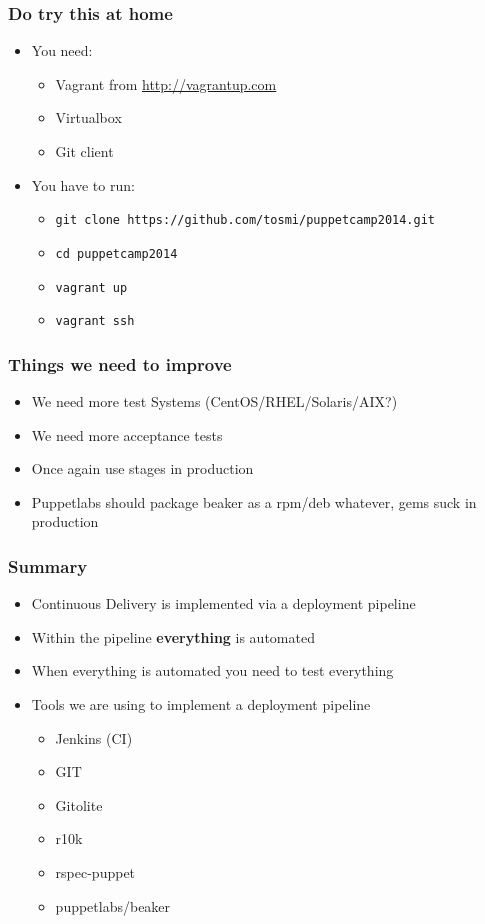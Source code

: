 \documentclass{beamer}
\begin{document}
\begin{frame}
\end{frame}

\begin{frame}
  \frametitle{Do try this at home}

  \begin{itemize}
  \item You need:
    \begin{itemize}
    \item Vagrant from \url{http://vagrantup.com}
    \item Virtualbox
    \item Git client
    \end{itemize}
  \item You have to run:
    \begin{itemize}
    \item \texttt{git clone https://github.com/tosmi/puppetcamp2014.git}
    \item \texttt{cd puppetcamp2014}
    \item \texttt{vagrant up}
    \item \texttt{vagrant ssh}
    \end{itemize}
  \end{itemize}
\end{frame}

\begin{frame}
  \frametitle{Things we need to improve}

  \begin{itemize}
  \item We need more test Systems (CentOS/RHEL/Solaris/AIX?)
  \item We need more acceptance tests
  \item Once again use stages in production
  \item Puppetlabs should package beaker as a rpm/deb whatever, gems
    suck in production
  \end{itemize}
\end{frame}

\begin{frame}
  \frametitle{Summary}

  \begin{itemize}
  \item<1-> Continuous Delivery is implemented via a deployment pipeline
  \item<2-> Within the pipeline \textbf{everything} is automated
  \item<3-> When everything is automated you need to test everything
  \item<4-> Tools we are using to implement a deployment pipeline
    \begin{itemize}
    \item Jenkins (CI)
    \item GIT
    \item Gitolite
    \item r10k
    \item rspec-puppet
    \item puppetlabs/beaker
    \end{itemize}
  \end{itemize}
\end{frame}

\begin{frame}
\end{frame}
\end{document}
